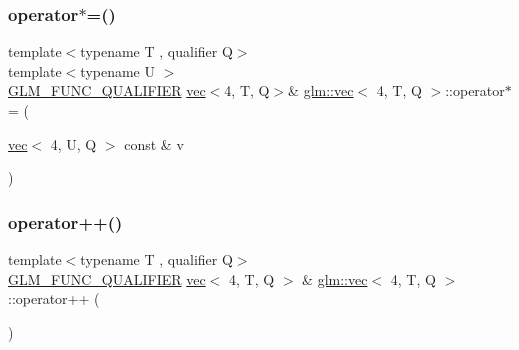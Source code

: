 \mbox{\label{structglm_1_1vec_3_014_00_01_t_00_01_q_01_4_a8223cbe0c80067bda5e8a87ebc4098cf}} 
\subsubsection{\texorpdfstring{operator$\ast$=()}{operator*=()}\hspace{0.1cm}{\footnotesize\ttfamily [6/6]}}
{\footnotesize\ttfamily template$<$typename T , qualifier Q$>$ \\
template$<$typename U $>$ \\
\mbox{\hyperlink{setup_8hpp_a33fdea6f91c5f834105f7415e2a64407}{G\+L\+M\+\_\+\+F\+U\+N\+C\+\_\+\+Q\+U\+A\+L\+I\+F\+I\+ER}} \mbox{\hyperlink{structglm_1_1vec}{vec}}$<$4, T, Q$>$\& \mbox{\hyperlink{structglm_1_1vec}{glm\+::vec}}$<$ 4, T, Q $>$\+::operator$\ast$= (\begin{DoxyParamCaption}\item[{\mbox{\hyperlink{structglm_1_1vec}{vec}}$<$ 4, U, Q $>$ const \&}]{v }\end{DoxyParamCaption})}

\mbox{\label{structglm_1_1vec_3_014_00_01_t_00_01_q_01_4_a8729def59c3f8b14075332c8603dd5c7}} 
\subsubsection{\texorpdfstring{operator++()}{operator++()}\hspace{0.1cm}{\footnotesize\ttfamily [1/2]}}
{\footnotesize\ttfamily template$<$typename T , qualifier Q$>$ \\
\mbox{\hyperlink{setup_8hpp_a33fdea6f91c5f834105f7415e2a64407}{G\+L\+M\+\_\+\+F\+U\+N\+C\+\_\+\+Q\+U\+A\+L\+I\+F\+I\+ER}} \mbox{\hyperlink{structglm_1_1vec}{vec}}$<$ 4, T, Q $>$ \& \mbox{\hyperlink{structglm_1_1vec}{glm\+::vec}}$<$ 4, T, Q $>$\+::operator++ (\begin{DoxyParamCaption}{ }\end{DoxyParamCaption})}

